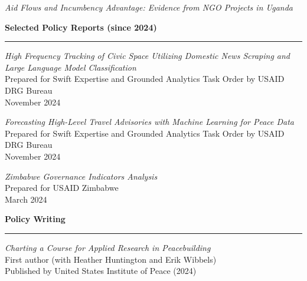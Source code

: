 \documentclass[11pt]{article}
\begin{document}
{\sl Aid Flows and Incumbency Advantage: Evidence from NGO Projects in Uganda}

\textbf{\large Selected Policy Reports (since 2024)}\\
\rule[3mm]{\textwidth}{.2pt}
{\sl High Frequency Tracking of Civic Space Utilizing Domestic News Scraping and Large Language Model Classification}\\
Prepared for Swift Expertise and Grounded Analytics Task Order by USAID DRG Bureau\\
November 2024

{\sl Forecasting High-Level Travel Advisories with Machine Learning for Peace Data}\\
Prepared for Swift Expertise and Grounded Analytics Task Order by USAID DRG Bureau\\
November 2024

{\sl Zimbabwe Governance Indicators Analysis}\\
Prepared for USAID Zimbabwe\\
March 2024

% 
% 
% 


\textbf{\large Policy Writing}\\
\rule[3mm]{\textwidth}{.2pt}
{\sl Charting a Course for Applied Research in Peacebuilding}\\
First author (with Heather Huntington and Erik Wibbels)\\
Published by United States Institute of Peace (2024)
\end{document}
